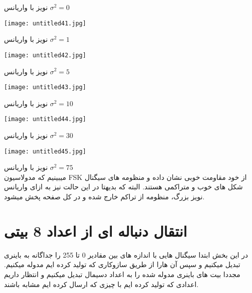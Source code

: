 \centering
نویز با واریانس ${\sigma}^2 = 0$
\\[1cm]


\begin{center}
    \texttt{[image: untitled41.jpg]}
\end{center}

\centering
نویز با واریانس ${\sigma}^2 = 1$
\\[0.5cm]


\begin{center}
    \texttt{[image: untitled42.jpg]}
\end{center}

\centering
نویز با واریانس ${\sigma}^2 = 5$
\\[1cm]


\begin{center}
    \texttt{[image: untitled43.jpg]}
\end{center}

\centering
نویز با واریانس ${\sigma}^2 = 10$
\\[0.5cm]


\begin{center}
    \texttt{[image: untitled44.jpg]}
\end{center}

\centering
نویز با واریانس ${\sigma}^2 = 30$
\\[1cm]


\begin{center}
    \texttt{[image: untitled45.jpg]}
\end{center}

\centering
نویز با واریانس ${\sigma}^2 = 75$
\\[0.5cm]

\justify
میبینیم که مدولاسیون FSK از خود مقاومت خوبی نشان داده و منظومه های سیگنال شکل های خوب و متراکمی هستند. البته که بدیهتا در این حالت نیز به ازای واریانس نویز بزرگ، منظومه از تراکم خارج شده و در کل صفحه پخش میشود.
\\[1.5cm]

\newpage
\huge
\section{انتقال دنباله ای از اعداد 8 بیتی}
\large
در این بخش ابتدا سیگنال هایی با اندازه های بین مقادیر 0 تا 255 را جداگانه به باینری تبدیل میکنیم و سپس آن هارا از طریق سازوکاری که تولید کرده ایم مدوله میکنیم. مجددا بیت های باینری مدوله شده را به اعداد دسیمال تبدیل میکنیم و انتظار داریم اعدادی که تولید کرده ایم با چیزی که ارسال کرده ایم مشابه باشند.
\\[1cm]

